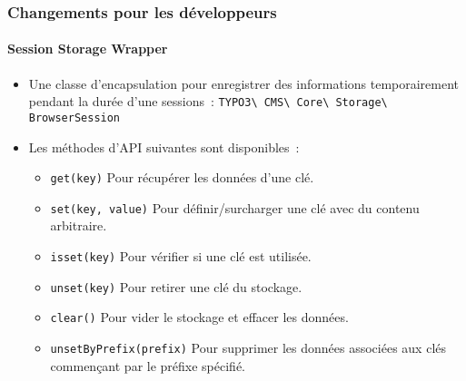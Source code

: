 %

\begin{frame}[fragile]
	\frametitle{Changements pour les développeurs}
	\framesubtitle{Session Storage Wrapper}


	\begin{itemize}
		\item Une classe d'encapsulation pour enregistrer des informations temporairement
			pendant la durée d'une sessions~:
			\smaller\texttt{TYPO3\textbackslash
				CMS\textbackslash
				Core\textbackslash
				Storage\textbackslash
				BrowserSession}\normalsize
		\item Les méthodes d'API suivantes sont disponibles~:
			\vspace{0.1cm}
			\begin{itemize}\smaller
				\item \texttt{get(key)}\newline
					Pour récupérer les données d'une clé.
				\item \texttt{set(key, value)}\newline
					Pour définir/surcharger une clé avec du contenu arbitraire.
				\item \texttt{isset(key)}\newline
					Pour vérifier si une clé est utilisée.
				\item \texttt{unset(key)}\newline
					Pour retirer une clé du stockage.
				\item \texttt{clear()}\newline
					Pour vider le stockage et effacer les données.
				\item \texttt{unsetByPrefix(prefix)}\newline
				 	Pour supprimer les données associées aux clés commençant par le préfixe spécifié.
			\end{itemize}\normalsize

	\end{itemize}

\end{frame}

